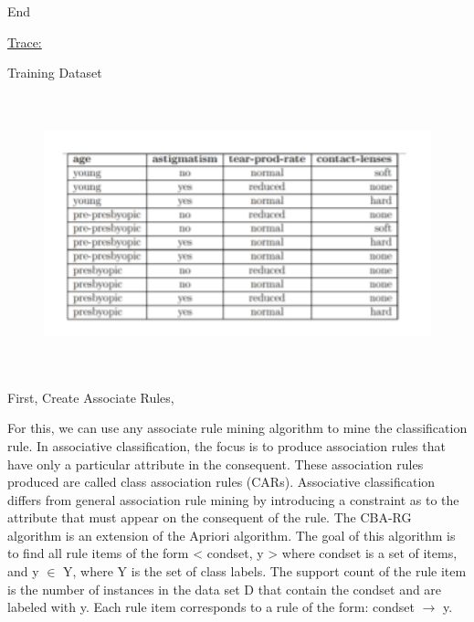 \documentclass[12pt]{article}
\renewcommand{\_}{\kern-1.5pt\textunderscore\kern-1.5pt}
\begin{document}
End\par


\vspace{\baselineskip}
{\fontsize{14pt}{16.8pt}\selectfont \uline{Trace:}\par}\par

Training Dataset\par




\begin{figure}[H]
	\begin{Center}
		\includegraphics[width=5.97in,height=3.16in]{./media/image31.png}
	\end{Center}
\end{figure}



\par

First, Create Associate Rules,\par

For this, we can use any associate rule mining algorithm to mine the classification rule. In associative classification, the focus is to produce association rules that have only a particular attribute in the consequent. These association rules produced are called class association rules (CARs). Associative classification differs from general association rule mining by introducing a constraint as to the attribute that must appear on the consequent of the rule. The CBA-RG algorithm is an extension of the Apriori algorithm. The goal of this algorithm is to find all rule items of the form < condset, y > where condset is a set of items, and y $ \in $  Y, where Y is the set of class labels. The support count of the rule item is the number of instances in the data set D that contain the condset and are labeled with y. Each rule item corresponds to a rule of the form: condset $ \rightarrow $  y.\par
\end{document}
